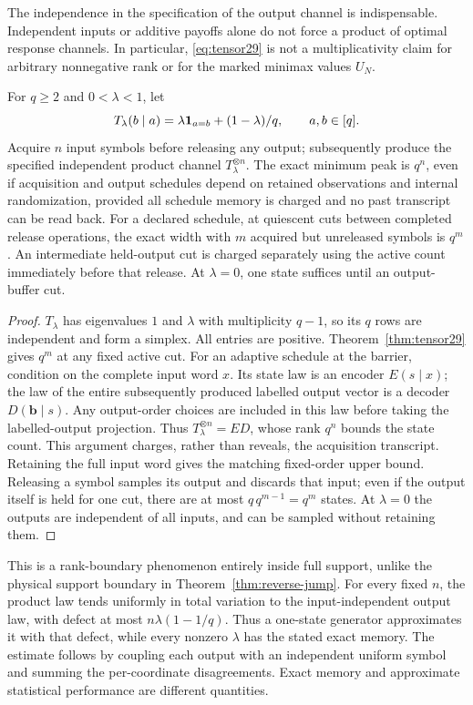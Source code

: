 The independence in the specification of the output channel is
indispensable. Independent inputs or additive payoffs alone do not
force a product of optimal response channels. In particular,
\eqref{eq:tensor29} is not a multiplicativity claim for arbitrary
nonnegative rank or for the marked minimax values $U_N$.

\begin{corollary}
\label{cor:barrier29}
For $q\ge2$ and $0<\lambda<1$, let
\[
 T_\lambda(b\mid a)=\lambda\mathbf 1_{a=b}+(1-\lambda)/q,
 \qquad a,b\in[q].
\]
Acquire $n$ input symbols before releasing any output; subsequently
produce the specified independent product channel $T_\lambda^{\otimes n}$.
The exact minimum peak is $q^n$, even if acquisition and output
schedules depend on retained observations and internal randomization,
provided all schedule memory is charged and no past transcript can be
read back. For a declared schedule, at quiescent cuts between completed release
operations, the exact width with $m$ acquired but unreleased symbols
is $q^m$. An intermediate held-output cut is charged separately using
the active count immediately before that release.
At $\lambda=0$, one state suffices until an output-buffer cut.
\end{corollary}
\begin{proof}
$T_\lambda$ has eigenvalues $1$ and $\lambda$ with multiplicity $q-1$,
so its $q$ rows are independent and form a simplex. All entries are
positive. Theorem~\ref{thm:tensor29} gives $q^m$ at any fixed active cut.
For an adaptive schedule at the barrier, condition on the complete
input word $x$. Its state law is an encoder $E(s\mid x)$; the law of
the entire subsequently produced labelled output vector is a decoder
$D(\mathbf b\mid s)$. Any output-order choices are included in this
law before taking the labelled-output projection. Thus
$T_\lambda^{\otimes n}=ED$, whose rank $q^n$ bounds the state count.
This argument charges, rather than reveals, the acquisition transcript.
Retaining the full input word gives the matching fixed-order upper
bound. Releasing a symbol samples its output and discards that input;
even if the output itself is held for one cut, there are at most
$q\,q^{m-1}=q^m$ states. At $\lambda=0$ the outputs are independent
of all inputs, and can be sampled without retaining them.
\end{proof}

This is a rank-boundary phenomenon entirely inside full support, unlike
the physical support boundary in Theorem~\ref{thm:reverse-jump}.
For every fixed $n$, the product law tends uniformly in total variation
to the input-independent output law, with defect at most
$n\lambda(1-1/q)$. Thus a one-state generator approximates it with that
defect, while every nonzero $\lambda$ has the stated exact memory.
The estimate follows by coupling each output with an independent
uniform symbol and summing the per-coordinate disagreements. Exact
memory and approximate statistical performance are different quantities.
